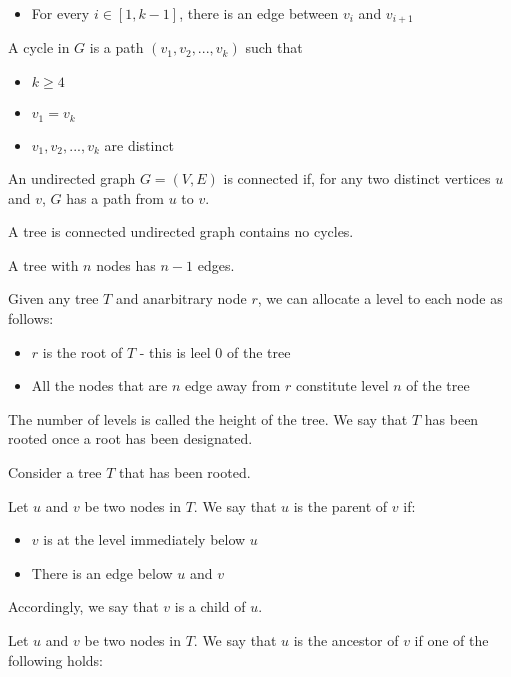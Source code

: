 \documentclass[fontsize=4pt]{scrartcl}
\begin{document}
\begin{multicols}{3}
    \begin{itemize}
        \item For every $i \in [1, k-1]$, there is an edge between $v_i$ and $v_{i+1}$
    \end{itemize}

    A cycle in $G$ is a path $(v_1, v_2, ..., v_k)$ such that

    \begin{itemize}
        \item $k \geqslant 4$
        \item $v_1 = v_k$
        \item $v_1, v_2, ..., v_k$ are distinct
    \end{itemize}


    An undirected graph $G = (V, E)$ is connected if, for any two distinct vertices $u$ and $v$, $G$ has a path from $u$ to $v$.

    A tree is connected undirected graph contains no cycles.

    A tree with $n$ nodes has $n - 1$ edges.

    Given any tree $T$ and anarbitrary node $r$, we can allocate a level to each node as follows:

    \begin{itemize}
        \item $r$ is the root of $T$ - this is leel 0 of the tree
        \item All the nodes that are $n$ edge away from $r$ constitute level $n$ of the tree
    \end{itemize}

    The number of levels is called the height of the tree. We say that $T$ has been rooted once a root has been designated.

    Consider a tree $T$ that has been rooted.

    Let $u$ and $v$ be two nodes in $T$. We say that $u$ is the parent of $v$ if:

    \begin{itemize}
        \item $v$ is at the level immediately below $u$
        \item There is an edge below $u$ and $v$
    \end{itemize}

    Accordingly, we say that $v$ is a child of $u$.


    Let $u$ and $v$ be two nodes in $T$. We say that $u$ is the ancestor of $v$ if one of the following holds:


\end{multicols}
\end{document}
